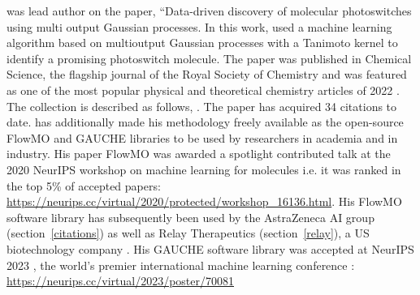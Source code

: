 \documentclass[11pt]{article}
\begin{document}
\dr was lead author on the paper, “Data-driven discovery of molecular photoswitches using multi output Gaussian processes. In this work, \dr used a machine learning algorithm based on multioutput Gaussian processes with a Tanimoto kernel to identify a promising photoswitch molecule. The paper was published in Chemical Science, the flagship journal of the Royal Society of Chemistry and was featured as one of the most popular physical and theoretical chemistry articles of 2022 \cite{most_pop}. The collection is described as follows,  \cite{most_pop}. The paper has acquired 34 citations to date. \dr has additionally made his methodology freely available as the open-source FlowMO and GAUCHE libraries to be used by researchers in academia and in industry. His paper FlowMO was awarded a spotlight contributed talk at the 2020 NeurIPS workshop on machine learning for molecules i.e. it was ranked in the top 5\% of accepted papers: \url{https://neurips.cc/virtual/2020/protected/workshop_16136.html}. His FlowMO software library has subsequently been used by the AstraZeneca AI group (section~\ref{citations}) as well as Relay Therapeutics (section~\ref{relay}), a US biotechnology company \cite{media}. His GAUCHE software library was accepted at NeurIPS 2023 \cite{neurips_papers}, the world's premier international machine learning conference \cite{gscholar}: \url{https://neurips.cc/virtual/2023/poster/70081} \\

 \\\\ \dg 
\end{document}
